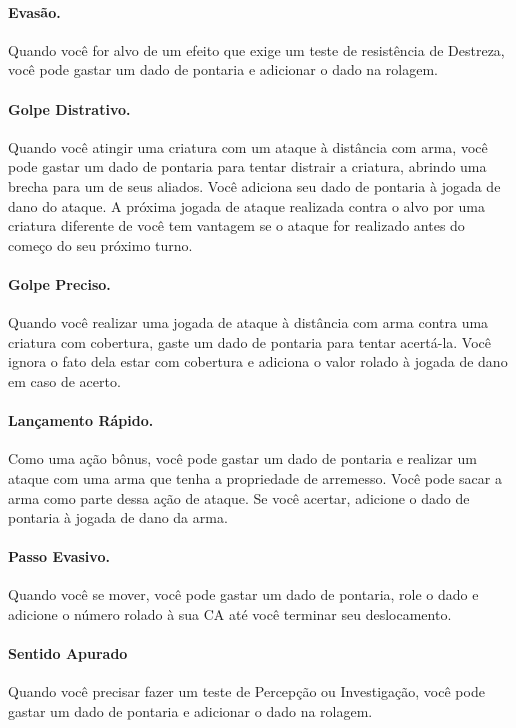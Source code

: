 \begin{multicols}{2}
\paragraph{Evasão.}%

Quando você for alvo de um efeito que exige um teste de resistência de Destreza,
você pode gastar um dado de pontaria e adicionar o dado na rolagem.

\paragraph{Golpe Distrativo.}%

Quando você atingir uma criatura com um ataque à distância com arma, você pode
gastar um dado de pontaria para tentar distrair a criatura, abrindo uma brecha
para um de seus aliados. Você adiciona seu dado de pontaria à jogada de dano do
ataque. A próxima jogada de ataque realizada contra o alvo por uma criatura
diferente de você tem vantagem se o ataque for realizado antes do começo do seu
próximo turno.

\paragraph{Golpe Preciso.}%

Quando você realizar uma jogada de ataque à distância com arma contra uma
criatura com cobertura, gaste um dado de pontaria para tentar acertá-la. Você
ignora o fato dela estar com cobertura e adiciona o valor rolado à jogada de
dano em caso de acerto.

\paragraph{Lançamento Rápido.}%

Como uma ação bônus, você pode gastar um dado de pontaria e realizar um ataque
com uma arma que tenha a propriedade de arremesso. Você pode sacar a arma como
parte dessa ação de ataque. Se você acertar, adicione o dado de pontaria à
jogada de dano da arma.

\paragraph{Passo Evasivo.}%

Quando você se mover, você pode gastar um dado de pontaria, role o dado e
adicione o número rolado à sua CA até você terminar seu deslocamento.

\paragraph{Sentido Apurado}%

Quando você precisar fazer um teste de Percepção ou Investigação, você pode
gastar um dado de pontaria e adicionar o dado na rolagem.

\end{multicols}



